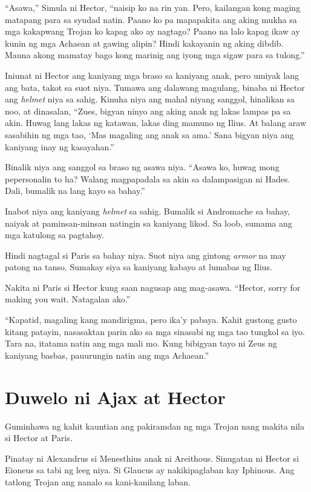 \documentclass[12pt,letterpaper]{report}
\begin{document}
``Asawa,'' Simula ni Hector, ``naisip ko na rin yan. Pero, kailangan kong maging matapang para sa syudad natin. Paano ko pa mapapakita ang aking mukha sa mga kakapwang Trojan ko kapag ako ay nagtago? Paano na lalo kapag ikaw ay kunin ng mga Achaean at gawing alipin? Hindi kakayanin ng aking dibdib. Mauna akong mamatay bago kong marinig ang iyong mga sigaw para sa tulong.''

Iniunat ni Hector ang kaniyang mga braso sa kaniyang anak, pero umiyak lang ang bata, takot sa suot niya. Tumawa ang dalawang magulang, binaba ni Hector ang \textit{helmet} niya sa sahig. Kinuha niya ang mahal niyang sanggol, hinalikan sa noo, at dinasalan, ``Zues, bigyan ninyo ang aking anak ng lakas lampas pa sa akin. Huwag lang lakas ng katawan, lakas ding mamuno ng Ilius. At balang araw sasabihin ng mga tao, `Mas magaling ang anak sa ama.' Sana bigyan niya ang kaniyang inay ng kasayahan.''

Binalik niya ang sanggol sa braso ng asawa niya. ``Asawa ko, huwag mong pepersonalin to ha? Walang magpapadala sa akin sa dalampasigan ni Hades. Dali, bumalik na lang kayo sa bahay.''

Inabot niya ang kaniyang \textit{helmet} sa sahig. Bumalik si Andromache sa bahay, naiyak at paminsan-minsan natingin sa kaniyang likod. Sa loob, sumama ang mga katulong sa pagtahoy.

Hindi nagtagal si Paris sa bahay niya. Suot niya ang gintong \textit{armor} na may patong na tanso. Sumakay siya sa kaniyang kabayo at lumabas ng Ilius.

Nakita ni Paris si Hector kung saan nagusap ang mag-asawa. ``Hector, sorry for making you wait. Natagalan ako.''

``Kapatid, magaling kang mandirigma, pero ika'y pabaya. Kahit gustong gusto kitang patayin, nasasaktan parin ako sa mga sinasabi ng mga tao tungkol sa iyo. Tara na, itatama natin ang mga mali mo. Kung bibigyan tayo ni Zeus ng kaniyang basbas, pauurungin natin ang mga Achaean.''

\pagebreak
\chapter{Duwelo ni Ajax at Hector}

Guminhawa ng kahit kauntian ang pakiramdan ng mga Trojan nang makita nila si Hector at Paris.

Pinatay ni Alexandrus si Menesthius anak ni Areithous. Sinugatan ni Hector si Eioneus sa tabi ng leeg niya. Si Glaucus ay nakikipaglaban kay Iphinous. Ang tatlong Trojan ang nanalo sa kani-kanilang laban.
\end{document}
